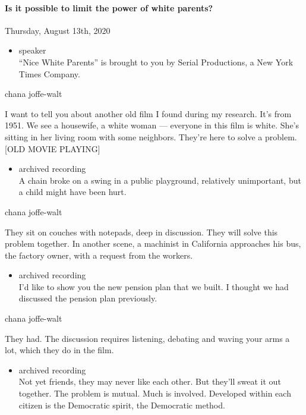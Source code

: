 \hypertarget{is-it-possible-to-limit-the-power-of-white-parents}{%
\paragraph{Is it possible to limit the power of white
parents?}\label{is-it-possible-to-limit-the-power-of-white-parents}}

Thursday, August 13th, 2020

\begin{itemize}
\tightlist
\item
  speaker\\
  ``Nice White Parents'' is brought to you by Serial Productions, a New
  York Times Company.
\end{itemize}

chana joffe-walt

I want to tell you about another old film I found during my research.
It's from 1951. We see a housewife, a white woman --- everyone in this
film is white. She's sitting in her living room with some neighbors.
They're here to solve a problem. {[}OLD MOVIE PLAYING{]}

\begin{itemize}
\tightlist
\item
  archived recording\\
  A chain broke on a swing in a public playground, relatively
  unimportant, but a child might have been hurt.
\end{itemize}

chana joffe-walt

They sit on couches with notepads, deep in discussion. They will solve
this problem together. In another scene, a machinist in California
approaches his bus, the factory owner, with a request from the workers.

\begin{itemize}
\tightlist
\item
  archived recording\\
  I'd like to show you the new pension plan that we built. I thought we
  had discussed the pension plan previously.
\end{itemize}

chana joffe-walt

They had. The discussion requires listening, debating and waving your
arms a lot, which they do in the film.

\begin{itemize}
\tightlist
\item
  archived recording\\
  Not yet friends, they may never like each other. But they'll sweat it
  out together. The problem is mutual. Much is involved. Developed
  within each citizen is the Democratic spirit, the Democratic method.
\end{itemize}


